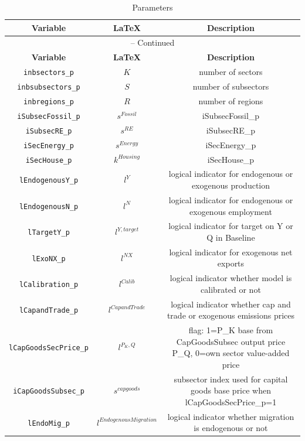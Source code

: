 \begin{center}
\begin{longtable}{ccc}
\caption{Parameters}\\%
\hline%
\multicolumn{1}{c}{\textbf{Variable}} &
\multicolumn{1}{c}{\textbf{\LaTeX}} &
\multicolumn{1}{c}{\textbf{Description}}\\%
\hline\hline%
\endfirsthead
\multicolumn{3}{c}{{\tablename} \thetable{} -- Continued}\\%
\hline%
\multicolumn{1}{c}{\textbf{Variable}} &
\multicolumn{1}{c}{\textbf{\LaTeX}} &
\multicolumn{1}{c}{\textbf{Description}}\\%
\hline\hline%
\endhead
\texttt{inbsectors\_p} & ${K}$ & number of sectors\\
\texttt{inbsubsectors\_p} & ${S}$ & number of subsectors\\
\texttt{inbregions\_p} & ${R}$ & number of regions\\
\texttt{iSubsecFossil\_p} & ${s^{Fossil}}$ & iSubsecFossil\_p\\
\texttt{iSubsecRE\_p} & ${s^{RE}}$ & iSubsecRE\_p\\
\texttt{iSecEnergy\_p} & ${s^{Energy}}$ & iSecEnergy\_p\\
\texttt{iSecHouse\_p} & ${k^{Housing}}$ & iSecHouse\_p\\
\texttt{lEndogenousY\_p} & ${l^{Y}}$ & logical indicator for endogenous or exogenous production\\
\texttt{lEndogenousN\_p} & ${l^{N}}$ & logical indicator for endogenous or exogenous employment\\
\texttt{lTargetY\_p} & ${l^{Y,target}}$ & logical indicator for target on Y or Q in Baseline\\
\texttt{lExoNX\_p} & ${l^{NX}}$ & logical indicator for exogenous net exports\\
\texttt{lCalibration\_p} & ${l^{Calib}}$ & logical indicator whether model is calibrated or not\\
\texttt{lCapandTrade\_p} & ${l^{CapandTrade}}$ & logical indicator whether cap and trade or exogenous emissions prices\\
\texttt{lCapGoodsSecPrice\_p} & ${l^{P_K,Q}}$ & flag: 1=P\_K base from CapGoodsSubsec output price P\_Q, 0=own sector value-added price\\
\texttt{iCapGoodsSubsec\_p} & ${s^{capgoods}}$ & subsector index used for capital goods base price when lCapGoodsSecPrice\_p=1\\
\texttt{lEndoMig\_p} & ${l^{Endogenous Migration}}$ & logical indicator whether migration is endogenous or not\\

\end{longtable}
\end{center}
